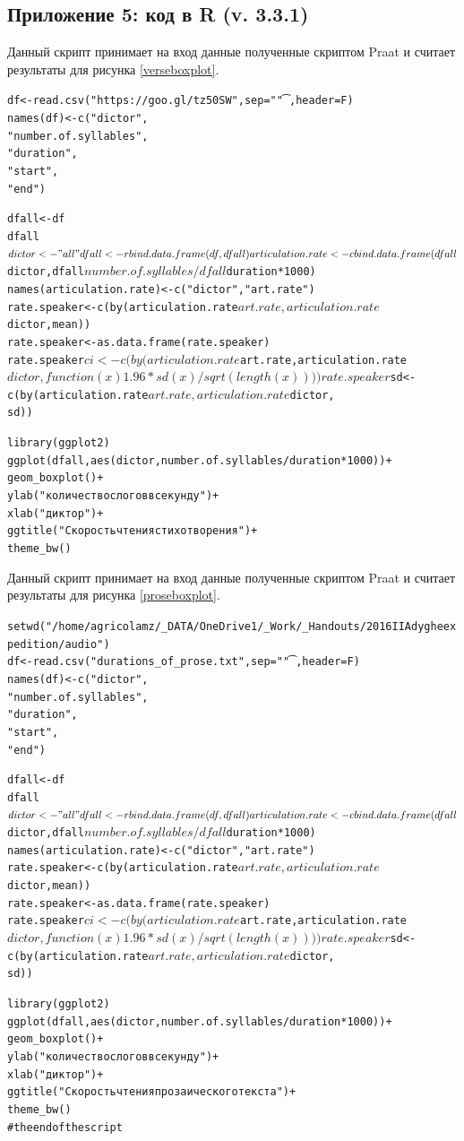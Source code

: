 \subsection{Приложение 5: код в R (v. 3.3.1)} \label{Rscript}
\noindent Данный скрипт принимает на вход данные полученные скриптом Praat и считает результаты для рисунка \ref{verseboxplot}.
\scriptsize
\begin{alltt}
df <- read.csv("https://goo.gl/tz50SW", sep = "\t", header = F)
names(df) <- c("dictor",
               "number.of.syllables",
               "duration",
               "start",
               "end")

dfall <- df
dfall$dictor <- "all"
dfall <- rbind.data.frame(df, dfall)

articulation.rate <- cbind.data.frame(dfall$dictor, dfall$number.of.syllables/dfall$duration*1000)
names(articulation.rate) <- c("dictor", "art.rate")
rate.speaker <- c(by(articulation.rate$art.rate, articulation.rate$dictor, mean))
rate.speaker <- as.data.frame(rate.speaker)
rate.speaker$ci <- c(by(articulation.rate$art.rate, articulation.rate$dictor, 
                        function(x){1.96*sd(x)/sqrt(length(x))}))
rate.speaker$sd <- c(by(articulation.rate$art.rate, articulation.rate$dictor, 
                        sd))

library(ggplot2)
ggplot(dfall, aes(dictor, number.of.syllables/duration*1000))+
  geom_boxplot()+
  ylab("количество слогов в секунду")+
  xlab("диктор")+
  ggtitle("Скорость чтения стихотворения")+
  theme_bw()
\end{alltt}
\normalsize
\noindent Данный скрипт принимает на вход данные полученные скриптом Praat и считает результаты для рисунка \ref{proseboxplot}.
\scriptsize
\begin{alltt}
setwd("/home/agricolamz/_DATA/OneDrive1/_Work/_Handouts/2016 II Adyghe expedition/audio")
df <- read.csv("durations_of_prose.txt", sep = "\t", header = F)
names(df) <- c("dictor",
               "number.of.syllables",
               "duration",
               "start",
               "end")

dfall <- df
dfall$dictor <- "all"
dfall <- rbind.data.frame(df, dfall)

articulation.rate <- cbind.data.frame(dfall$dictor, dfall$number.of.syllables/dfall$duration*1000)
names(articulation.rate) <- c("dictor", "art.rate")
rate.speaker <- c(by(articulation.rate$art.rate, articulation.rate$dictor, mean))
rate.speaker <- as.data.frame(rate.speaker)
rate.speaker$ci <- c(by(articulation.rate$art.rate, articulation.rate$dictor, 
                        function(x){1.96*sd(x)/sqrt(length(x))}))
rate.speaker$sd <- c(by(articulation.rate$art.rate, articulation.rate$dictor, 
                        sd))


library(ggplot2)
ggplot(dfall, aes(dictor, number.of.syllables/duration*1000))+
  geom_boxplot()+
  ylab("количество слогов в секунду")+
  xlab("диктор")+
  ggtitle("Скорость чтения прозаического текста")+
  theme_bw()
# the end of the script
\end{alltt}
\normalsize
\pagebreak
